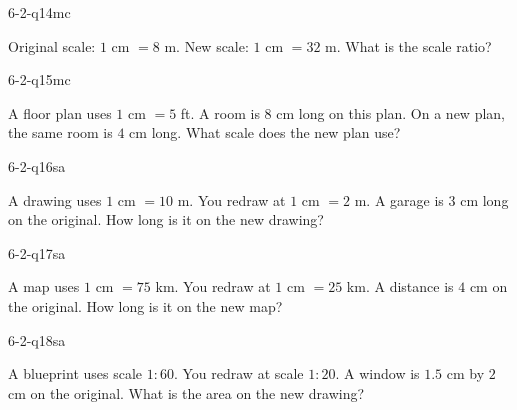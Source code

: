 \begin{practiceQuestion}{6-2-q14}{mc}
\begin{questionText}
Original scale: $1$ cm $= 8$ m. New scale: $1$ cm $= 32$ m. What is the scale ratio?
\end{questionText}
\end{practiceQuestion}

\begin{practiceQuestion}{6-2-q15}{mc}
\begin{questionText}
A floor plan uses $1$ cm $= 5$ ft. A room is $8$ cm long on this plan. On a new plan, the same room is $4$ cm long. What scale does the new plan use?
\end{questionText}
\end{practiceQuestion}


\begin{practiceQuestion}{6-2-q16}{sa}
\begin{questionText}
A drawing uses $1$ cm $= 10$ m. You redraw at $1$ cm $= 2$ m. A garage is $3$ cm long on the original. How long is it on the new drawing?
\end{questionText}
\end{practiceQuestion}

\begin{practiceQuestion}{6-2-q17}{sa}
\begin{questionText}
A map uses $1$ cm $= 75$ km. You redraw at $1$ cm $= 25$ km. A distance is $4$ cm on the original. How long is it on the new map?
\end{questionText}
\end{practiceQuestion}

\begin{practiceQuestion}{6-2-q18}{sa}
\begin{questionText}
A blueprint uses scale $1:60$. You redraw at scale $1:20$. A window is $1.5$ cm by $2$ cm on the original. What is the area on the new drawing?
\end{questionText}
\end{practiceQuestion}

